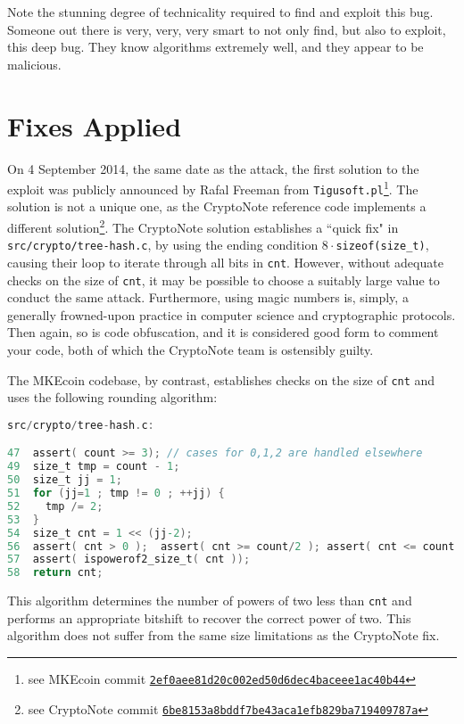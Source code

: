 \documentclass{mrl}
\begin{document}
Note the stunning degree of technicality required to find and exploit this bug. Someone out there is very, very, very smart to not only find, but also to exploit, this deep bug. They know algorithms extremely well, and they appear to be malicious.

\section{Fixes Applied}
On 4 September 2014, the same date as the attack, the first solution to the exploit was publicly announced by Rafal Freeman from \texttt{Tigusoft.pl}\footnote{see MKEcoin commit \href{https://github.com/MKEcoin-project/bitmonero/commit/2ef0aee81d20c002ed50d6dec4baceee1ac40b44}{\nolinkurl{2ef0aee81d20c002ed50d6dec4baceee1ac40b44}}}. The solution is not a unique one, as the CryptoNote reference code implements a different solution\footnote{see CryptoNote commit \href{https://github.com/cryptonotefoundation/cryptonote/commit/6be8153a8bddf7be43aca1efb829ba719409787a}{\nolinkurl{6be8153a8bddf7be43aca1efb829ba719409787a}}}. The CryptoNote solution establishes a ``quick fix" in \texttt{src/crypto/tree-hash.c}, by using the ending condition \texttt{$8\cdot$sizeof(size\_t)}, causing their loop to iterate through all bits in \texttt{cnt}. However, without adequate checks on the size of \texttt{cnt}, it may be possible to choose a suitably large value to conduct the same attack. Furthermore, using magic numbers is, simply, a generally frowned-upon practice in computer science and cryptographic protocols. Then again, so is code obfuscation, and it is considered good form to comment your code, both of which the CryptoNote team is ostensibly guilty.

The MKEcoin codebase, by contrast, establishes checks on the size of \texttt{cnt} and uses the following rounding algorithm:

\begin{lstlisting}[language=C]
src/crypto/tree-hash.c:

47  assert( count >= 3); // cases for 0,1,2 are handled elsewhere
49  size_t tmp = count - 1;
50  size_t jj = 1;
51  for (jj=1 ; tmp != 0 ; ++jj) {
52    tmp /= 2;
53  }
54  size_t cnt = 1 << (jj-2);
56  assert( cnt > 0 );	assert( cnt >= count/2 ); assert( cnt <= count );
57  assert( ispowerof2_size_t( cnt ));
58  return cnt;

\end{lstlisting}

This algorithm determines the number of powers of two less than \texttt{cnt} and performs an appropriate bitshift to recover the correct power of two. This algorithm does not suffer from the same size limitations as the CryptoNote fix.
\end{document}

